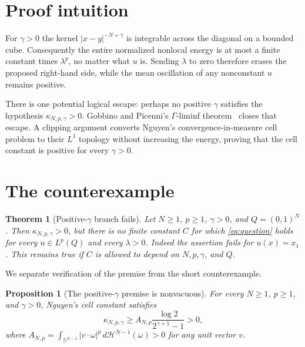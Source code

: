 \documentclass[11pt]{article}
\newtheorem{theorem}{Theorem}
\newtheorem{proposition}{Proposition}
\newcommand{\Sph}{\mathbb{S}}
\begin{document}
\section{Proof intuition}

For $\gamma>0$ the kernel $|x-y|^{-N+\gamma}$ is integrable across the
diagonal on a bounded cube.  Consequently the entire normalized nonlocal
energy is at most a finite constant times $\lambda^p$, no matter what $u$ is.
Sending $\lambda$ to zero therefore erases the proposed right-hand side, while
the mean oscillation of any nonconstant $u$ remains positive.

There is one potential logical escape: perhaps no positive $\gamma$ satisfies
the hypothesis $\kappa_{N,p,\gamma}>0$.  Gobbino and Picenni's
$\Gamma$-liminf theorem~\cite{GobbinoPicenni} closes that escape.  A clipping
argument converts Nguyen's convergence-in-measure cell problem to their
$L^1$ topology without increasing the energy, proving that the cell constant
is positive for every $\gamma>0$.

\section{The counterexample}

\begin{theorem}[Positive-$\gamma$ branch fails]\label{thm:main}
Let $N\ge1$, $p\ge1$, $\gamma>0$, and $Q=(0,1)^N$.  Then
$\kappa_{N,p,\gamma}>0$, but there is no finite constant $C$ for which
\eqref{eq:question} holds for every $u\in L^p(Q)$ and every $\lambda>0$.
Indeed the assertion fails for $u(x)=x_1$.  This remains true if $C$ is
allowed to depend on $N,p,\gamma$, and $Q$.
\end{theorem}

We separate verification of the premise from the short counterexample.

\begin{proposition}[The positive-$\gamma$ premise is nonvacuous]
For every $N\ge1$, $p\ge1$, and $\gamma>0$, Nguyen's cell constant satisfies
\begin{equation}\label{eq:kappa-lower}
 \kappa_{N,p,\gamma}
 \ge A_{N,p}\frac{\log 2}{2^{\gamma+1}-1}>0,
\end{equation}
where
$A_{N,p}=\int_{\Sph^{N-1}}|v\cdot\omega|^p\,
d\mathcal H^{N-1}(\omega)>0$ for any unit vector $v$.
\end{proposition}
\end{document}
